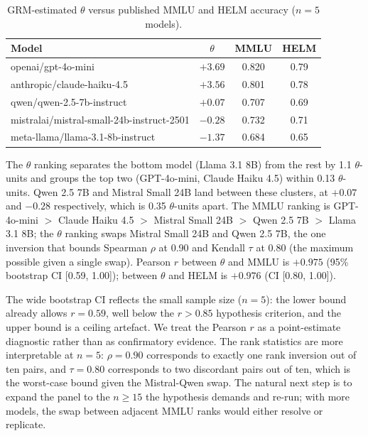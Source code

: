 \documentclass[11pt,letterpaper]{article}
\begin{document}
\begin{table}[!htbp]
  \centering
  \caption{GRM-estimated $\theta$ versus published MMLU and HELM accuracy ($n = 5$ models).}
  \label{tab:theta-ranking}
  \begin{tabular}{lccc}
    \toprule
    Model & $\theta$ & MMLU & HELM \\
    \midrule
    openai/gpt-4o-mini              & $+3.69$ & 0.820 & 0.79 \\
    anthropic/claude-haiku-4.5      & $+3.56$ & 0.801 & 0.78 \\
    qwen/qwen-2.5-7b-instruct       & $+0.07$ & 0.707 & 0.69 \\
    mistralai/mistral-small-24b-instruct-2501 & $-0.28$ & 0.732 & 0.71 \\
    meta-llama/llama-3.1-8b-instruct& $-1.37$ & 0.684 & 0.65 \\
    \bottomrule
  \end{tabular}
\end{table}

The $\theta$ ranking separates the bottom model (Llama 3.1 8B) from the rest by 1.1 $\theta$-units and groups the top two (GPT-4o-mini, Claude Haiku 4.5) within 0.13 $\theta$-units. Qwen 2.5 7B and Mistral Small 24B land between these clusters, at $+0.07$ and $-0.28$ respectively, which is 0.35 $\theta$-units apart. The MMLU ranking is GPT-4o-mini $>$ Claude Haiku 4.5 $>$ Mistral Small 24B $>$ Qwen 2.5 7B $>$ Llama 3.1 8B; the $\theta$ ranking swaps Mistral Small 24B and Qwen 2.5 7B, the one inversion that bounds Spearman $\rho$ at 0.90 and Kendall $\tau$ at 0.80 (the maximum possible given a single swap). Pearson $r$ between $\theta$ and MMLU is $+0.975$ (95\% bootstrap CI [0.59, 1.00]); between $\theta$ and HELM is $+0.976$ (CI [0.80, 1.00]).

The wide bootstrap CI reflects the small sample size ($n = 5$): the lower bound already allows $r = 0.59$, well below the $r > 0.85$ hypothesis criterion, and the upper bound is a ceiling artefact. We treat the Pearson $r$ as a point-estimate diagnostic rather than as confirmatory evidence. The rank statistics are more interpretable at $n = 5$: $\rho = 0.90$ corresponds to exactly one rank inversion out of ten pairs, and $\tau = 0.80$ corresponds to two discordant pairs out of ten, which is the worst-case bound given the Mistral-Qwen swap. The natural next step is to expand the panel to the $n \geq 15$ the hypothesis demands and re-run; with more models, the swap between adjacent MMLU ranks would either resolve or replicate.
\end{document}
